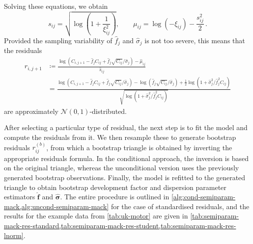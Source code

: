 \documentclass[a4paper]{book}
\begin{document}
Solving these equations, we obtain
\begin{equation}
  s_{ij} = \sqrt{\log \left( 1 + \frac{1}{\xi^2_{ij}} \right)}, \qquad \mu_{ij} = \log(-\xi_{ij}) - \frac{s^2_{ij}}{2} \,.
\end{equation}
Provided the sampling variability of $\widehat{f}_j$ and $\widehat{\sigma}_j$ is not too severe, this means that the residuals
\begin{align} \label{eq:log-normal-resids}
  r_{i, j + 1}
   & \coloneqq \frac{\log \left( C_{i, j + 1} - \widehat{f}_j C_{ij} + \widehat{f}_j \sqrt{C_{ij}} / \widehat{\sigma}_j \right) - \widehat{\mu}_{ij}}{\widehat{s}_{ij}}                                                                                                                                                                                           \\
   & = \frac{\log \left( C_{i, j + 1} - \widehat{f}_j C_{ij} + \widehat{f}_j \sqrt{C_{ij}} / \widehat{\sigma}_j \right) - \log(\widehat{f}_j \sqrt{C_{ij}} / \widehat{\sigma}_j) + \frac{1}{2} \log \left( 1 + \widehat{\sigma}^2_j / \widehat{f}^2_j C_{ij} \right)}{\sqrt{\log \left( 1 + \widehat{\sigma}^2_j / \widehat{f}^2_j C_{ij} \right)}}
\end{align}
are approximately $\mathcal{N}(0, 1)$-distributed.

After selecting a particular type of residual, the next step is to fit the model and compute the residuals from it. We then resample these to generate bootstrap residuals $r^{(b)}_{ij}$, from which a bootstrap triangle is obtained by inverting the appropriate residuals formula. In the conditional approach, the inversion is based on the original triangle, whereas the unconditional version uses the previously generated bootstrap observations. Finally, the model is refitted to the generated triangle to obtain bootstrap development factor and dispersion parameter estimators $\widehat{\bm{f}}$ and $\widehat{\bm{\sigma}}$. The entire procedure is outlined in \cref{alg:cond-semiparam-mack,alg:uncond-semiparam-mack} for the case of standardised residuals, and the results for the example data from \cref{tab:uk-motor} are given in \cref{tab:semiparam-mack-res-standard,tab:semiparam-mack-res-student,tab:semiparam-mack-res-lnorm}.
\end{document}
